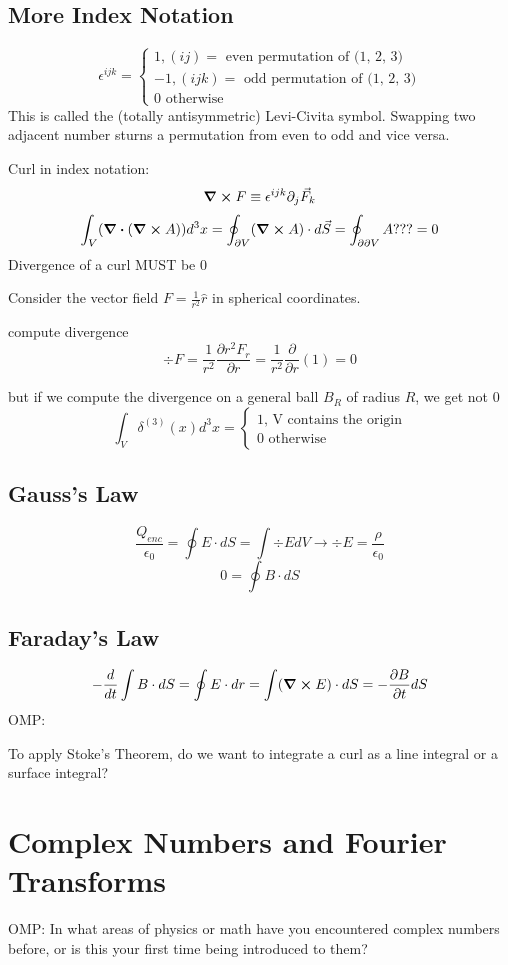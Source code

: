 \documentclass{report}
\newcommand{\del}{\partial}
\newcommand{\pdif}[2]{ \frac{\partial #1}{ \partial #2} }
\newcommand{\pderiv}[1]{ \frac{\partial}{ \partial #1} }
\begin{document}
\section{More Index Notation}
\[
\epsilon^{ijk} = 
\begin{cases}
1, (ij) = \textrm{ even permutation of (1, 2, 3)} \\
-1, (ijk) = \textrm{ odd permutation of (1, 2, 3)} \\
0 \textrm{ otherwise}
\end{cases}
\]
This is called the (totally antisymmetric) Levi-Civita symbol. Swapping two adjacent number sturns a permutation from even to odd and vice versa.

Curl in index notation:
\[
\curl F
\equiv 
\epsilon^{ijk} \del_j \vec{F}_k
\]
\[
\int_V (\div (\curl A)) d^3x 
=
\oint_{\del V} (\curl A) \cdot d\vec{S}
=
\oint_{\del \del V} A???
=
0
\]
Divergence of a curl MUST be 0

Consider the vector field $F = \frac{1}{r^2} \hat{r}$ in spherical coordinates.

compute divergence
\[
\div F
=
\frac{1}{r^2}
\pdif{r^2F_r}{r}
=
\frac{1}{r^2}\pderiv{r}(1) 
= 
0
\]

but if we compute the divergence on a general ball $B_R$ of radius $R$, we get not 0
\[
\int_V \delta^{(3)}(x)d^3x 
=
\begin{cases}
1 \textrm{, V contains the origin} \\
0 \textrm{ otherwise}
\end{cases}
\]
\section{Gauss's Law}
\[
\frac{Q_{enc}}{\epsilon_0} = \oint E \cdot dS = \int \div E dV \rightarrow \div E = \frac{\rho}{\epsilon_0}
\]
\[
0 = \oint B \cdot dS
\]
\section{Faraday's Law}
\[
- \frac{d}{dt} \int B \cdot dS = \oint E \cdot dr = \int (\curl E) \cdot dS = -\pdif{B}{t} dS
\]
OMP:

To apply Stoke's Theorem, do we want to integrate a curl as a line integral or a surface integral?


\chapter{Complex Numbers and Fourier Transforms}
OMP:
In what areas of physics or math have you encountered complex numbers before, or is this your first time being introduced to them?
\end{document}
